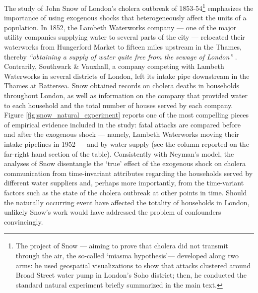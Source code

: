 \documentclass[11pt]{article}
\begin{document}
\begin{refsection}
The study of John Snow of London's cholera outbreak of 1853-54\footnote{The project of Snow --- aiming to prove that cholera did not transmit through the air, the so-called `miasma hypothesis'--- developed along two arms: he used geospatial visualizations to show that attacks clustered around Broad Street water pump in London's Soho district; then, he conducted the standard natural experiment briefly summarized in the main text.} emphasizes the importance of using exogenous shocks that heterogeneously affect the units of a population. In 1852, the Lambeth Waterworks company --- one of the major utility companies supplying water to several parts of the city --- relocated their waterworks from Hungerford Market to fifteen miles upstream in the Thames, thereby \textit{``obtaining a supply of water quite free from the sewage of London''} \autocite[][page 68]{snow_1855}. Contrarily, Southwark \& Vauxhall, a company competing with Lambeth Waterworks in several districts of London, left its intake pipe downstream in the Thames at Battersea. Snow obtained records on cholera deaths in households throughout London, as well as information on the company that provided water to each household and the total number of houses served by each company. Figure \ref{fig:snow_natural_experiment} reports one of the most compelling pieces of empirical evidence included in the study: fatal attacks are compared before and after the exogenous shock --- namely, Lambeth Waterworks moving their intake pipelines in 1952 --- and by water supply (see the column reported on the far-right hand section of the table). Consistently with Neyman's model, the analyses of Snow disentangle the `true' effect of the exogenous shock on cholera communication from time-invariant attributes regarding the households served by different water suppliers and, perhaps more importantly, from the time-variant factors such as the state of the cholera outbreak at other points in time. Should the naturally occurring event have affected the totality of households in London, unlikely Snow's work would have addressed the problem of confounders convincingly.  

\begin{figure}
  \begin{small}
    \begin{center}
     

\end{center}
\end{small}
\end{figure}
\end{refsection}
\end{document}
